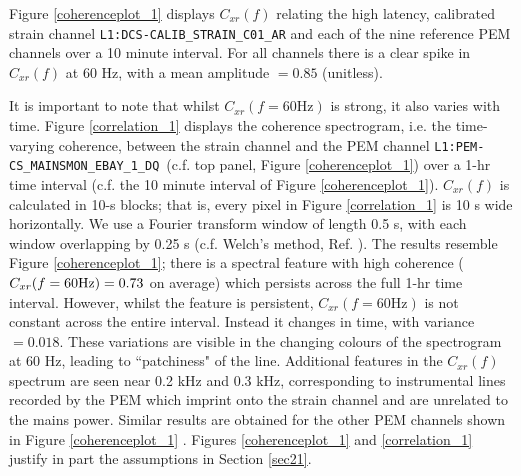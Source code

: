\documentclass[pra,superscriptaddress,reprint,amsmath,amssymb,nofootinbib]{revtex4-2}
\newcommand{\PEMChanName}{\texttt{L1:PEM-CS\_MAINSMON\_EBAY\_1\_DQ}}
\begin{document}
Figure \ref{coherenceplot_1} displays $C_{xr}(f)$ relating the high latency, calibrated strain channel \texttt{L1:DCS-CALIB\_STRAIN\_C01\_AR} and each of the nine reference PEM channels over a 10 minute interval. For all channels there is a clear spike in $C_{xr}(f)$ at 60 Hz, with a mean amplitude $=0.85$ (unitless). \newline 

 It is important to note that whilst $C_{xr}(f=60 \text{Hz})$ is strong, it also varies with time. Figure \ref{correlation_1} displays the coherence spectrogram, i.e. the time-varying coherence, between the strain channel and the PEM channel \PEMChanName \, (c.f. top panel, Figure \ref{coherenceplot_1}) over a 1-hr time interval (c.f. the 10 minute interval of Figure \ref{coherenceplot_1}). $C_{xr}(f)$ is calculated in 10-s blocks; that is, every pixel in Figure \ref{correlation_1} is 10 s wide horizontally. We use a Fourier transform window of length 0.5 s, with each window overlapping by 0.25 s (c.f. Welch's method, Ref. \citep{Welch1161901}). The results resemble Figure \ref{coherenceplot_1}; there is a spectral feature with high coherence ($C_{xr}(f=60 \rm Hz) = 0.73$ on average) which persists across the full 1-hr time interval. However, whilst the feature is persistent, $C_{xr}(f=60 \text{Hz})$ is not constant across the entire interval. Instead it changes in time, with variance $=0.018$. These variations are visible in the changing colours of the spectrogram at 60 Hz, leading to ``patchiness" of the line. Additional features in the $C_{xr}(f)$ spectrum are seen near 0.2 kHz and 0.3 kHz, corresponding to instrumental lines recorded by the PEM which imprint onto the strain channel and are unrelated to the mains power. Similar results are obtained for the other PEM channels shown in Figure \ref{coherenceplot_1}	. Figures  \ref{coherenceplot_1} and  \ref{correlation_1} justify in part the assumptions in Section \ref{sec21}.
\end{document}
